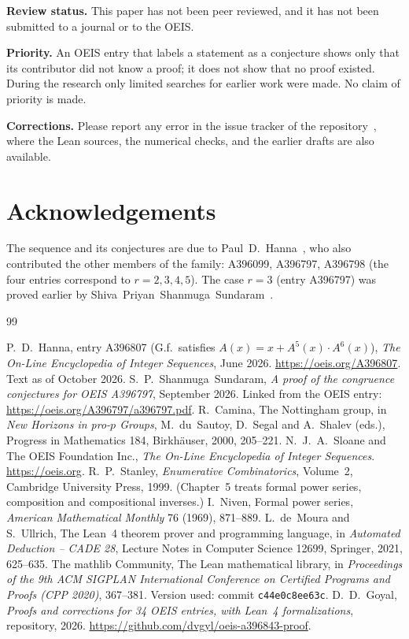 \documentclass[11pt,a4paper]{article}
\theoremstyle{definition}
\theoremstyle{remark}
\newcommand{\para}[1]{\par\medskip\noindent\textbf{#1}\enspace}
\begin{document}
\para{Review status.} This paper has not been peer reviewed, and it has not been submitted to a journal or to the OEIS.

\para{Priority.} An OEIS entry that labels a statement as a conjecture shows only that its contributor did not know
a proof; it does not show that no proof existed. During the research only limited searches for earlier work were
made. No claim of priority is made.

\para{Corrections.} Please report any error in the issue tracker of the repository~\cite{repo}, where the Lean
sources, the numerical checks, and the earlier drafts are also available.

\section*{Acknowledgements}
The sequence and its conjectures are due to Paul~D.~Hanna~\cite{oeis}, who also contributed the other members of the
family: A396099, A396797, A396798 (the four entries correspond to $r=2,3,4,5$). The case $r=3$ (entry A396797) was
proved earlier by Shiva~Priyan~Shanmuga~Sundaram~\cite{sundaram}. 

\begin{thebibliography}{99}\small
\raggedright
{} P.~D.~Hanna, entry A396807 (G.f.\ satisfies $A(x)=x+A^{5}(x)\cdot A^{6}(x)$), \emph{The On-Line Encyclopedia of Integer Sequences}, June 2026. \url{https://oeis.org/A396807}. Text as of October 2026.
 S.~P.~Shanmuga~Sundaram, \emph{A proof of the congruence conjectures for OEIS A396797}, September 2026. Linked from the OEIS entry: \url{https://oeis.org/A396797/a396797.pdf}.
 R.~Camina, The Nottingham group, in \emph{New Horizons in pro-$p$ Groups}, M.~du~Sautoy, D.~Segal and A.~Shalev (eds.), Progress in Mathematics 184, Birkh\"auser, 2000, 205--221.
 N.~J.~A.~Sloane and The OEIS Foundation Inc., \emph{The On-Line Encyclopedia of Integer Sequences}. \url{https://oeis.org}.
 R.~P.~Stanley, \emph{Enumerative Combinatorics}, Volume~2, Cambridge University Press, 1999. (Chapter~5 treats formal power series, composition and compositional inverses.)
 I.~Niven, Formal power series, \emph{American Mathematical Monthly} 76 (1969), 871--889.
 L.~de~Moura and S.~Ullrich, The Lean~4 theorem prover and programming language, in \emph{Automated Deduction -- CADE 28}, Lecture Notes in Computer Science 12699, Springer, 2021, 625--635.
 The mathlib Community, The Lean mathematical library, in \emph{Proceedings of the 9th ACM SIGPLAN International Conference on Certified Programs and Proofs (CPP 2020)}, 367--381. Version used: commit \texttt{c44e0c8ee63c}.
 D.~D.~Goyal, \emph{Proofs and corrections for 34 OEIS entries, with Lean~4 formalizations}, repository, 2026. \url{https://github.com/dvgyl/oeis-a396843-proof}.
\end{thebibliography}
\end{document}
